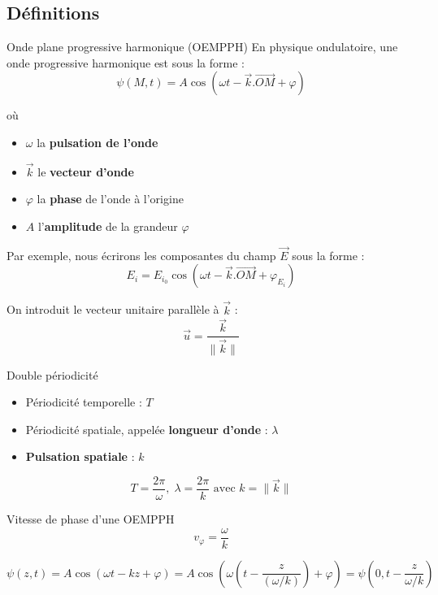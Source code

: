\subsection{Définitions}
\begin{Definition}[colbacktitle=red!75!black]{Onde plane progressive harmonique (OEMPPH)}{}
En physique ondulatoire, une onde progressive harmonique est sous la forme :
\[
\psi(M,t) = A \cos ( \omega t - \overrightarrow{k} .\overrightarrow{OM} + \varphi)
\]

où
\begin{itemize}
    \item $ \omega $ la \textbf{pulsation de l'onde}
    \item $\overrightarrow{k}$ le \textbf{vecteur d'onde}
    \item $\varphi$ la \textbf{phase} de l'onde à l'origine
    \item $A$ l'\textbf{amplitude} de la grandeur $\varphi$
\end{itemize}

Par exemple, nous écrirons les composantes du champ $\overrightarrow{E} $ sous la forme :
\[
E_i = E_{i_0} \cos( \omega t - \overrightarrow{k} . \overrightarrow{OM} + \varphi_{E_i})
\]

On introduit le vecteur unitaire parallèle à $\overrightarrow{k} $ :
\[
\overrightarrow{u}  = \frac{\overrightarrow{k} }{ \|\overrightarrow{k}\|  } 
\]
\end{Definition}

\begin{Prop}{Double périodicité}{}
  \begin{itemize}
    \item Périodicité temporelle : $T$ 
    \item Périodicité spatiale, appelée \textbf{longueur d'onde} : $\lambda$
    \item \textbf{Pulsation spatiale} : $k$
  \end{itemize}

\[
  T = \frac{2\pi}{\omega}, \; \lambda = \frac{2\pi}{k} \text{ avec } k = \| \overrightarrow{k} \|
\]
\end{Prop}

\begin{Prop}{Vitesse de phase d'une OEMPPH }{}
\[
v_\varphi = \frac{\omega}{k} 
\]
\end{Prop}
\begin{myproof}{}{}
\[
  \psi (z,t) = A \cos(\omega t - kz + \varphi) = A \cos \left( \omega \left( t - \frac{z}{(\omega/k)}\right)+ \varphi\right) = \psi \left( 0, t - \frac{z}{\omega/k}\right)
\]
\end{myproof}


